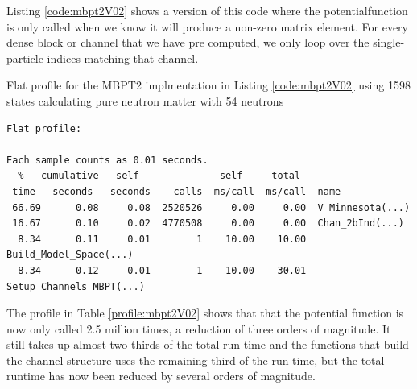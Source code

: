 Listing \ref{code:mbpt2V02} shows a version of this code where the potentialfunction is
only called when we know it will produce a non-zero matrix element. For
every dense block or channel that we have pre computed, we only loop over the
single-particle indices matching that channel.
\begin{table}
\caption{Flat profile for the MBPT2 implmentation in Listing \ref{code:mbpt2V02}
using 1598 states calculating pure neutron matter with 54 neutrons}\label{profile:mbpt2V02}
\begin{verbatim}
Flat profile:

Each sample counts as 0.01 seconds.
  %   cumulative   self              self     total           
 time   seconds   seconds    calls  ms/call  ms/call  name    
 66.69      0.08     0.08  2520526     0.00     0.00  V_Minnesota(...)
 16.67      0.10     0.02  4770508     0.00     0.00  Chan_2bInd(...)
  8.34      0.11     0.01        1    10.00    10.00  Build_Model_Space(...)
  8.34      0.12     0.01        1    10.00    30.01  Setup_Channels_MBPT(...)
\end{verbatim}
\end{table}
    The profile in Table \ref{profile:mbpt2V02} shows that that the
    potential function is now only called 2.5 million times, a reduction of three
    orders of magnitude. It still takes up almost two thirds of the total run
    time and the functions that build the channel structure uses the remaining
    third of the run time, but the total runtime has now been reduced by several
    orders of magnitude.
